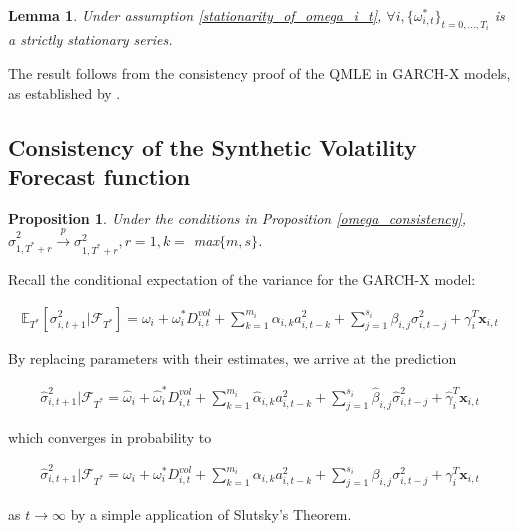 \documentclass[11pt]{article}
\newcommand{\x}{\textbf{x}}
\def\E{\mathbb{E}} %
\newtheorem{lem}{Lemma}
\newtheorem{prop}{Proposition}
\theoremstyle{definition}
\newenvironment{proof-of-proposition}[1][{}]{\noindent{\bf
    Proof of Proposition {#1}}
  \hspace*{.5em}}{\qed\bigskip\\}
\begin{document}
\begin{lem}
  Under assumption \ref{stationarity_of_omega_i_t}, $\forall i, \{\omega_{i,t}^{*}\}_{t=0,...,T_i}$ is a strictly stationary series.
\end{lem}

\begin{proof-of-proposition}
The result follows from the consistency proof of the QMLE in GARCH-X models, as established by \citet{han2014asymptotic}.
\end{proof-of-proposition}

  \subsection{Consistency of the Synthetic Volatility Forecast function}
\begin{prop}\label{sigma_consistency}
  Under the conditions in Proposition \ref{omega_consistency}, $\hat\sigma^{2}_{1,T^{*}+r}\xrightarrow{p}\sigma^{2}_{1,T^{*}+r}, r = 1, k =$ max$\{m,s\}$.
\end{prop}

\begin{proof-of-proposition}
Recall the conditional expectation of the variance for the GARCH-X model:

\begin{align}
\E_{T^{*}}[\sigma^{2}_{i,t+1}|\mathcal{F}_{T^{*}}] = \omega_{i} + \omega^{*}_i D^{vol}_{i,t} + \sum^{m_{i}}_{k=1}\alpha_{i,k}a^{2}_{i,t-k} + \sum_{j=1}^{s_{i}}\beta_{i,j}\sigma_{i,t-j}^{2} + \gamma_{i}^{T} \x_{i,t}
\end{align}

By replacing parameters with their estimates, we arrive at the prediction 

\begin{align}
\hat\sigma^{2}_{i,t+1}|\mathcal{F}_{T^{*}} = \hat\omega_{i} + \hat\omega^{*}_i D^{vol}_{i,t} + \sum^{m_{i}}_{k=1}\hat\alpha_{i,k}a^{2}_{i,t-k} + \sum_{j=1}^{s_{i}}\hat\beta_{i,j}\hat\sigma_{i,t-j}^{2} + \hat\gamma_{i}^{T} \x_{i,t}
\end{align}

which converges in probability to 

\begin{align}
  \hat\sigma^{2}_{i,t+1}|\mathcal{F}_{T^{*}} = \omega_{i} + \omega^{*}_i D^{vol}_{i,t} + \sum^{m_{i}}_{k=1}\alpha_{i,k}a^{2}_{i,t-k} + \sum_{j=1}^{s_{i}}\beta_{i,j}\sigma_{i,t-j}^{2} + \gamma_{i}^{T} \x_{i,t}
  \end{align}

as $t\rightarrow\infty$ by a simple application of Slutsky's Theorem.

\end{proof-of-proposition}
\end{document}
